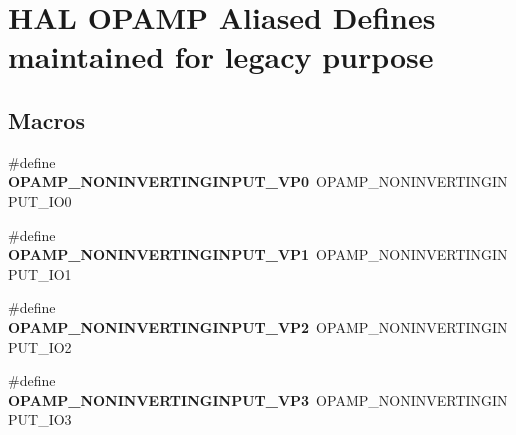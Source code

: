 \hypertarget{group___h_a_l___o_p_a_m_p___aliased___defines}{}\section{H\+AL O\+P\+A\+MP Aliased Defines maintained for legacy purpose}
\label{group___h_a_l___o_p_a_m_p___aliased___defines}
\subsection*{Macros}
\begin{DoxyCompactItemize}
\item 
\mbox{\label{group___h_a_l___o_p_a_m_p___aliased___defines_ga0c8a66d4ef4f3e5ddff93741d59730a9}} 
\#define {\bfseries O\+P\+A\+M\+P\+\_\+\+N\+O\+N\+I\+N\+V\+E\+R\+T\+I\+N\+G\+I\+N\+P\+U\+T\+\_\+\+V\+P0}~O\+P\+A\+M\+P\+\_\+\+N\+O\+N\+I\+N\+V\+E\+R\+T\+I\+N\+G\+I\+N\+P\+U\+T\+\_\+\+I\+O0
\item 
\mbox{\label{group___h_a_l___o_p_a_m_p___aliased___defines_ga2373d73432511331d18e850f2cbcb637}} 
\#define {\bfseries O\+P\+A\+M\+P\+\_\+\+N\+O\+N\+I\+N\+V\+E\+R\+T\+I\+N\+G\+I\+N\+P\+U\+T\+\_\+\+V\+P1}~O\+P\+A\+M\+P\+\_\+\+N\+O\+N\+I\+N\+V\+E\+R\+T\+I\+N\+G\+I\+N\+P\+U\+T\+\_\+\+I\+O1
\item 
\mbox{\label{group___h_a_l___o_p_a_m_p___aliased___defines_gaefe0c48289b99fc2a72078562ab1bbce}} 
\#define {\bfseries O\+P\+A\+M\+P\+\_\+\+N\+O\+N\+I\+N\+V\+E\+R\+T\+I\+N\+G\+I\+N\+P\+U\+T\+\_\+\+V\+P2}~O\+P\+A\+M\+P\+\_\+\+N\+O\+N\+I\+N\+V\+E\+R\+T\+I\+N\+G\+I\+N\+P\+U\+T\+\_\+\+I\+O2
\item 
\mbox{\label{group___h_a_l___o_p_a_m_p___aliased___defines_ga45a66909e6190a2cef2b6cb1a623ef3e}} 
\#define {\bfseries O\+P\+A\+M\+P\+\_\+\+N\+O\+N\+I\+N\+V\+E\+R\+T\+I\+N\+G\+I\+N\+P\+U\+T\+\_\+\+V\+P3}~O\+P\+A\+M\+P\+\_\+\+N\+O\+N\+I\+N\+V\+E\+R\+T\+I\+N\+G\+I\+N\+P\+U\+T\+\_\+\+I\+O3
\item 
\mbox{\label{group___h_a_l___o_p_a_m_p___aliased___defines_ga0ca7da83e2be923743de9b1fa58e0b01}} 

\end{DoxyCompactItemize}
